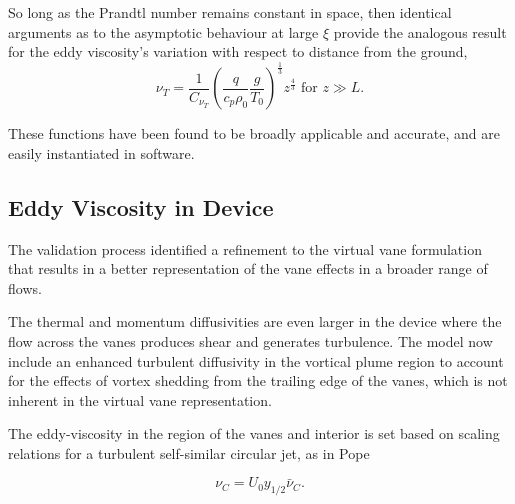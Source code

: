 So long as the Prandtl number remains constant in space, then
identical arguments as to the asymptotic behaviour at large $\xi$ provide
the analogous result for the eddy viscosity's variation with respect to
distance from the ground,  
\begin{equation}
 \nu_T = \frac{1}{C_{\nu_T}} \left( \frac{q}{c_p \rho_0} \frac{g}{T_0}
			     \right)^\frac{1}{3} z^{\frac{4}{3}}  \text{ 
for } z \gg L. 
\end{equation}

These functions have been found to be broadly applicable and
accurate\cite{Foken2006}, and are easily instantiated in software.

\subsection{Eddy Viscosity in Device}

The validation process identified a refinement to the virtual vane
formulation that results in a better representation of the vane
effects in a broader range of flows. 

The thermal and momentum diffusivities are even larger in the
device where the flow across the vanes produces shear and generates
turbulence. The model now include an enhanced turbulent diffusivity in
the vortical plume region to account for the effects of vortex shedding
from the trailing edge of the vanes, which is not inherent in the
virtual vane representation.   


The eddy-viscosity in the region of the vanes and interior is set based
on scaling relations for a turbulent self-similar circular jet, as in 
Pope\cite{pope2000turbulent}
 
\begin{equation}
  \nu_C = U_0 y_{1/2} \bar \nu_C.
\end{equation}

